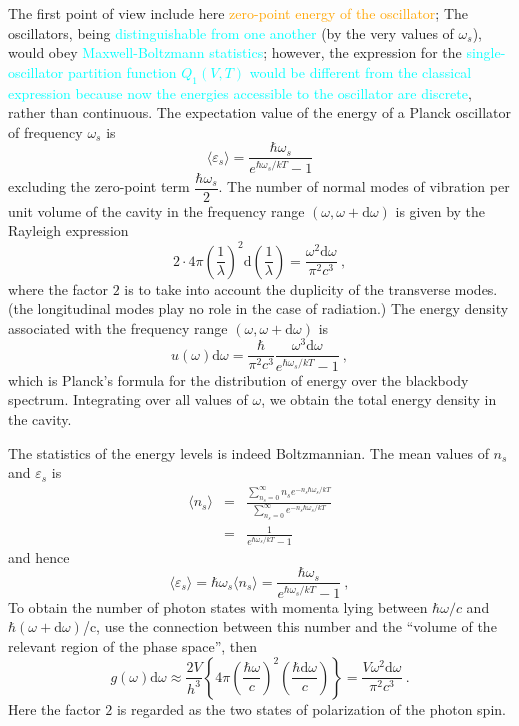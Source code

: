 \documentclass[12pt,a4paper]{article}
\newcommand{\dif}{\mathrm{d}}
\begin{document}
The first point of view include here \textcolor{orange}{zero-point energy of the oscillator}; The oscillators, being \textcolor{cyan}{distinguishable from one another} (by the very values of $\omega_s$), would obey \textcolor{cyan}{Maxwell-Boltzmann statistics}; however, the expression for the \textcolor{cyan}{single-oscillator partition function $Q_1(V, T)$ would be different from the classical expression because now the energies accessible to the oscillator are discrete}, rather than continuous. The expectation value of the energy of a Planck oscillator of
frequency $\omega_s$ is  
\begin{equation}
\langle \varepsilon_s \rangle = \frac{\hbar \omega_s}{e^{\hbar \omega_s/kT} -1}
\end{equation}
excluding the zero-point term $\dfrac{\hbar \omega_s}{2}$. The number of normal modes of vibration per unit volume of the cavity in the frequency range $(\omega, \omega + \dif \omega)$ is given by the Rayleigh expression
\begin{equation}
2\cdot 4\pi \left(\frac{1}{\lambda} \right)^2 \dif \left(\frac{1}{\lambda} \right) = \frac{\omega^2 \dif \omega}{\pi^2 c^3} ~,
\end{equation}
where the factor $2$ is to take into account the duplicity of the transverse modes.(the longitudinal modes play no role in the case of radiation.) The energy density associated with the frequency range $(\omega, \omega + \dif \omega)$ is
\begin{equation}
u(\omega) \dif \omega = \frac{\hbar}{\pi^2 c^3} \frac{ \omega^3\dif \omega}{e^{\hbar \omega_s/kT} -1} ~,
\end{equation}
which is Planck’s formula for the distribution of energy over the blackbody spectrum. Integrating over all values of $\omega$, we obtain the total energy density in the cavity.

The statistics of the energy levels is indeed Boltzmannian. The mean values of $n_s$ and $\varepsilon_s$ is
\begin{eqnarray}
\langle n_s \rangle &=& \frac{\sum\limits_{n_s=0}^\infty n_s e^{-n_s \hbar \omega_s/kT}  }{\sum\limits_{n_s=0}^\infty e^{-n_s \hbar \omega_s/kT}} \\
&=& \frac{1}{e^{\hbar \omega_s/kT} -1}
\end{eqnarray}
and hence
\begin{equation}
\langle \varepsilon_s \rangle = \hbar \omega_s \langle n_s \rangle =  \frac{\hbar \omega_s}{e^{\hbar \omega_s/kT} -1} ~,
\end{equation}
To obtain the number of photon states with momenta lying between $\hbar \omega/c$ and $\hbar (\omega+\dif \omega)$/c, use the connection between this number and the “volume of the relevant region of the phase space”, then
\begin{equation}
g(\omega) \dif \omega \approx \frac{2V}{h^3} \left\{4\pi \left(\frac{\hbar \omega}{c} \right)^2 \left(\frac{\hbar \dif \omega}{c} \right) \right\} = \frac{V\omega^2 \dif \omega}{\pi^2 c^3} ~.
\end{equation}
Here the factor $2$ is regarded as the two states of polarization of the photon spin.
\end{document}
